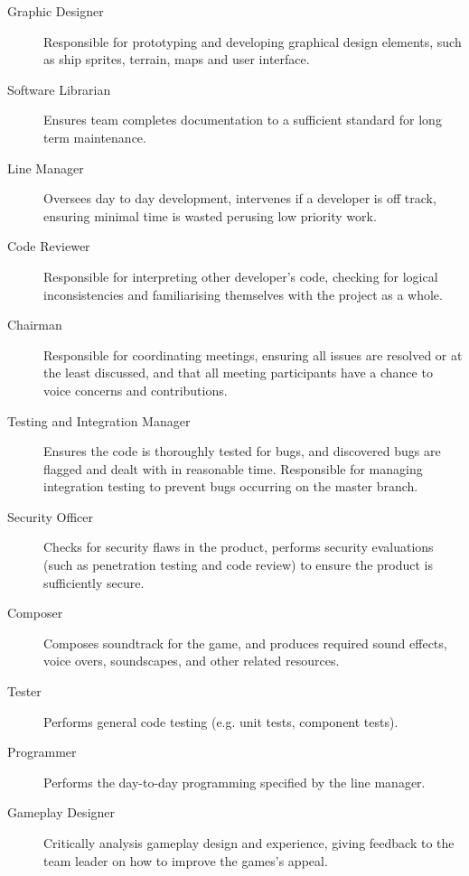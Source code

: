 \begin{description}
    \item[Graphic Designer] Responsible for prototyping and developing graphical design elements, such as ship sprites, terrain, maps and user interface.
     
    \item[Software Librarian] Ensures team completes documentation to a sufficient standard for long term maintenance. 
     
    \item[Line Manager] Oversees day to day development, intervenes if a developer is off track, ensuring minimal time is wasted perusing low priority work.
     
    \item[Code Reviewer] Responsible for interpreting other developer's code, checking for logical inconsistencies and familiarising themselves with the project as a whole.
     
    \item[Chairman] Responsible for coordinating meetings, ensuring all issues are resolved or at the least discussed, and that all meeting participants have a chance to voice concerns and contributions.
     
    \item[Testing and Integration Manager] Ensures the code is thoroughly tested for bugs, and discovered bugs are flagged and dealt with in reasonable time. Responsible for managing integration testing to prevent bugs occurring on the master branch.
     
    \item[Security Officer] Checks for security flaws in the product, performs security evaluations (such as penetration testing and code review) to ensure the product is sufficiently secure.
     
    \item[Composer] Composes soundtrack for the game, and produces required sound effects, voice overs, soundscapes, and other related resources.
    
    \item[Tester] Performs general code testing (e.g. unit tests, component tests).
    
    \item[Programmer] Performs the day-to-day programming specified by the line manager.
    
    \item[Gameplay Designer] Critically analysis gameplay design and experience, giving feedback to the team leader on how to improve the games's appeal.
\end{description}

